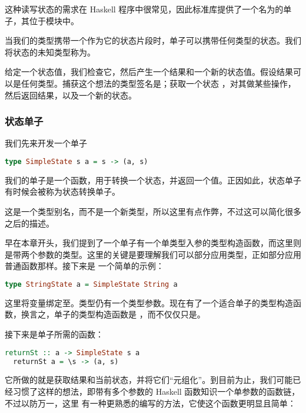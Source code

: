 \documentclass[./main.tex]{subfiles}
\begin{document}
这种读写状态的需求在 Haskell 程序中很常见，因此标准库提供了一个名为的单子，其位于模块中。

当我们的类型携带一个作为它的状态片段时，单子可以携带任何类型的状态。我们将状态的未知类型称为。

给定一个状态值，我们检查它，然后产生一个结果和一个新的状态值。假设结果可以是任何类型。捕获这个想法的类型签名是；获取一个状态
，对其做某些操作，然后返回结果，以及一个新的状态。

\subsubsection*{状态单子}

我们先来开发一个单子

\begin{lstlisting}[language=Haskell]
  type SimpleState s a = s -> (a, s)
\end{lstlisting}

我们的单子是一个函数，用于转换一个状态，并返回一个值。正因如此，状态单子有时候会被称为状态转换单子。

这是一个类型别名，而不是一个新类型，所以这里有点作弊，不过这可以简化很多之后的描述。

早在本章开头，我们提到了一个单子有一个单类型入参的类型构造函数，而这里则是带两个参数的类型。这里的关键是要理解我们可以部分应用类型，正如部分应用普通函数那样。接下来是
一个简单的示例：

\begin{lstlisting}[language=Haskell]
  type StringState a = SimpleState String a
\end{lstlisting}

这里将变量绑定至。类型仍有一个类型参数。现在有了一个适合单子的类型构造函数，换言之，单子的类型构造函数是
，而不仅仅只是。

接下来是单子所需的函数：

\begin{lstlisting}[language=Haskell]
  returnSt :: a -> SimpleState s a
  returnSt a = \s -> (a, s)
\end{lstlisting}

它所做的就是获取结果和当前状态，并将它们“元组化”。到目前为止，我们可能已经习惯了这样的想法，即带有多个参数的 Haskell 函数知识一个单参数的函数链，不过以防万一，这里
有一种更熟悉的编写的方法，它使这个函数更明显且简单：
\end{document}
